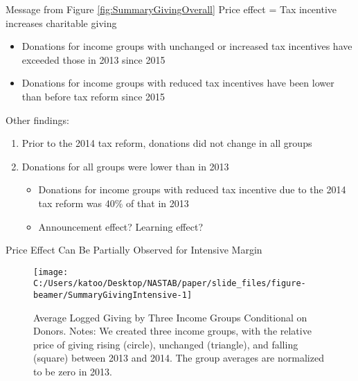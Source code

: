 \documentclass[
  ignorenonframetext,
  aspectratio=169,
]{beamer}
\providecommand{\tightlist}{%
  \setlength{\itemsep}{0pt}\setlength{\parskip}{0pt}}
\begin{document}
\begin{frame}{Message from Figure \ref{fig:SummaryGivingOverall}}
\protect\hypertarget{message-from-figure-reffigsummarygivingoverall}{}
Price effect = Tax incentive increases charitable giving

\begin{itemize}
\tightlist
\item
  Donations for income groups with unchanged or increased tax incentives have exceeded those in 2013 since 2015
\item
  Donations for income groups with reduced tax incentives have been lower than before tax reform since 2015
\end{itemize}

Other findings:

\begin{enumerate}
\tightlist
\item
  Prior to the 2014 tax reform, donations did not change in all groups
\item
  Donations for all groups were lower than in 2013

  \begin{itemize}
  \tightlist
  \item
    Donations for income groups with reduced tax incentive due to the 2014 tax reform was 40\% of that in 2013
  \item
    Announcement effect? Learning effect?
  \end{itemize}
\end{enumerate}
\end{frame}

\begin{frame}{Price Effect Can Be Partially Observed for Intensive Margin}
\protect\hypertarget{price-effect-can-be-partially-observed-for-intensive-margin}{}
\begin{figure}[t]

{\centering \texttt{[image: C:/Users/katoo/Desktop/NASTAB/paper/slide\_files/figure-beamer/SummaryGivingIntensive-1]} 

}

\caption{Average Logged Giving by Three Income Groups Conditional on Donors. Notes: We created three income groups, with the relative price of giving rising (circle), unchanged (triangle), and falling (square) between 2013 and 2014. The group averages are normalized to be zero in 2013.}\label{fig:SummaryGivingIntensive}
\end{figure}
\end{frame}
\end{document}
